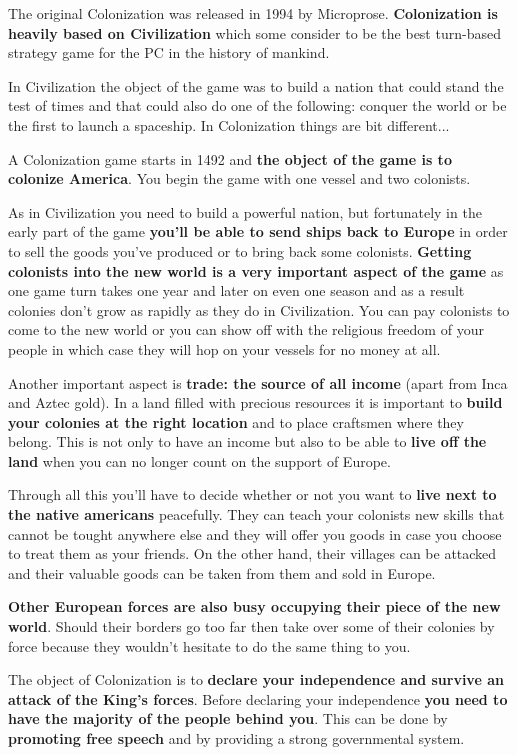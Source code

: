 \documentclass[12pt]{book}
\begin{document}
The original Colonization was
released in 1994 by Microprose. \textbf{Colonization is heavily based
on Civilization} which some consider to be the best turn-based
strategy game for the PC in the history of mankind.

In Civilization the object of the game was to build a nation that
could stand the test of times and that could also do one of the
following: conquer the world or be the first to launch a
spaceship. In Colonization things are bit different...

A Colonization game starts in 1492 and \textbf{the object of the game
is to colonize America}. You begin the game with one vessel and two
colonists.

As in Civilization you need to build a powerful nation, but
fortunately in the early part of the game \textbf{you'll be able to
send ships back to Europe} in order to sell the goods you've produced
or to bring back some colonists. \textbf{Getting colonists into the
new world is a very important aspect of the game} as one game turn
takes one year and later on even one season and as a result colonies
don't grow as rapidly as they do in Civilization. You can pay
colonists to come to the new world or you can show off with the
religious freedom of your people in which case they will hop on your
vessels for no money at all.

Another important aspect is \textbf{trade: the source of all income}
(apart from Inca and Aztec gold). In a land filled with precious
resources it is important to \textbf{build your colonies at the right
location} and to place craftsmen where they belong. This is not only
to have an income but also to be able to \textbf{live off the land}
when you can no longer count on the support of Europe.

Through all this you'll have to decide whether or not you want to
\textbf{live next to the native americans} peacefully. They can teach
your colonists new skills that cannot be tought anywhere else and they
will offer you goods in case you choose to treat them as your
friends. On the other hand, their villages can be attacked and their
valuable goods can be taken from them and sold in Europe.

\textbf{Other European forces are also busy occupying their piece of
the new world}. Should their borders go too far then take over some
of their colonies by force because they wouldn't hesitate to do the
same thing to you.

The object of Colonization is to \textbf{declare your independence and
survive an attack of the King's forces}. Before declaring your
independence \textbf{you need to have the majority of the people
behind you}. This can be done by \textbf{promoting free speech} and by
providing a strong governmental system.
\end{document}
